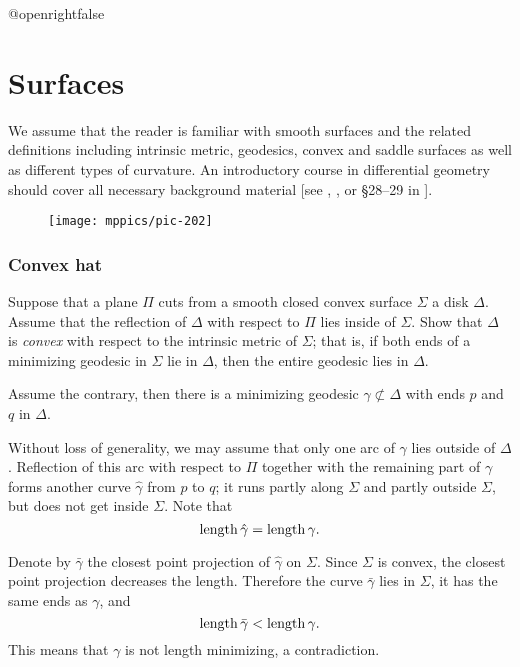 \csname @openrightfalse\endcsname
\chapter{Surfaces}

We assume that the reader is familiar with smooth surfaces and the related definitions
including intrinsic metric, 
geodesics,
convex and saddle surfaces
as well as different types of curvature.
An introductory course in differential geometry should cover all necessary background material 
[see , , or \S28--29 in ].



{

\begin{wrapfigure}{r}{27 mm}
\vskip4mm
\centering
\texttt{[image: mppics/pic-202]}
\end{wrapfigure}


\subsection*{Convex hat}
\label{Convex hat}

\begin{pr}
Suppose that a plane $\Pi$ cuts from a smooth closed convex surface $\Sigma$ a disk $\Delta$.
Assume that the reflection of $\Delta$ with respect to $\Pi$ lies inside of $\Sigma$.
Show that $\Delta$ is \emph{convex} with respect to the intrinsic metric  of $\Sigma$;
that is, 
if both ends of a minimizing geodesic in $\Sigma$ 
lie in $\Delta$,
then the entire geodesic lies in $\Delta$.
\end{pr}

}


Assume the contrary,
then there is a minimizing geodesic $\gamma\not\subset\Delta$ with ends $p$ and $q$ in $\Delta$.

Without loss of generality, we may assume that only one arc of $\gamma$ lies outside of $\Delta$.
Reflection of this arc  with respect to $\Pi$ together with the remaining part of $\gamma$ forms another curve $\hat\gamma$ from $p$ to $q$;
it runs partly along $\Sigma$ 
and partly outside $\Sigma$,
but does not get inside $\Sigma$.
Note that
\[\operatorname{\rm length}\hat\gamma=\operatorname{\rm length}\gamma.\]


Denote by $\bar\gamma$ the closest point projection of $\hat\gamma$ on $\Sigma$.
Since $\Sigma$ is convex, the closest point projection decreases the length.
Therefore 
the curve $\bar\gamma$ lies in $\Sigma$, 
it has the same ends as $\gamma$,
and
\[\operatorname{\rm length}\bar\gamma<\operatorname{\rm length}\gamma.\]
This means that $\gamma$ is not length minimizing, 
a contradiction.\qeds

